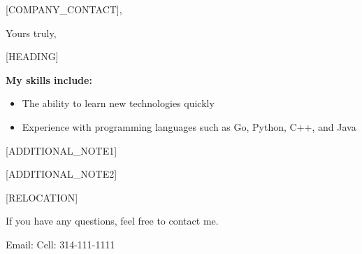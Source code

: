 

\date{\today}
\opening{[COMPANY_CONTACT],}
\closing{Yours truly,}
\makelettertitle

\setlength{\parindent}{0pt}
\newcommand{\forceindent}{\leavevmode{\parindent=0.6cm\indent}}

[HEADING] \newline

\textbf{My skills include:}
\begin{itemize}
  [ADDITIONAL_SKILL_1]
  [ADDITIONAL_SKILL_2]
  [ADDITIONAL_SKILL_3]
  \item The ability to learn new technologies quickly
  \item Experience with programming languages such as Go, Python, C++, and Java
\end{itemize}

[ADDITIONAL_NOTE1]

[ADDITIONAL_NOTE2]

[RELOCATION]

If you have any questions, feel free to contact me.

Email:  \newline
Cell: 314-111-1111

\makeletterclosing

